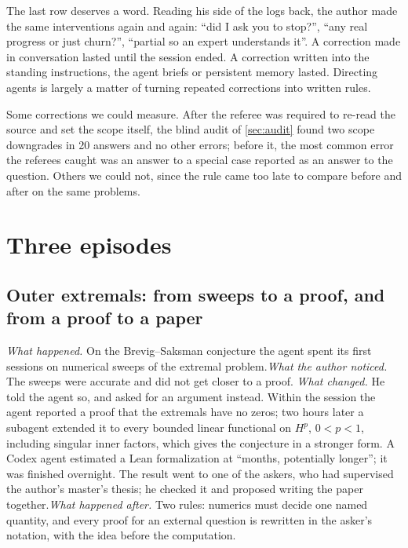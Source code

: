 \documentclass[11pt]{amsart}
\newcommand*{\sectionbreak}{\clearpage} %
\begin{document}
The last row deserves a word. Reading his side of the logs back, the author
made the same interventions again and again: ``did I ask you to stop?'', ``any %
real progress or just churn?'', ``partial %
so an expert understands it''. A correction made in conversation lasted until
the session ended. A correction written into the standing instructions, the
agent briefs or persistent memory lasted. Directing agents is largely a matter
of turning repeated corrections into written rules.

Some corrections we could measure. After the referee was required to re-read
the source and set the scope itself, the blind audit of \cref{sec:audit} found
two scope downgrades in 20 answers and no other errors; before it, the most
common error the referees caught was an answer to a special case reported as an
answer to the question. Others we could not, since the rule came too late to
compare before and after on the same problems.

\sectionbreak
\section{Three episodes}\label{sec:episodes}

\subsection*{Outer extremals: from sweeps to a proof, and from a proof to a paper}
\emph{What happened.} On the Brevig--Saksman conjecture the agent spent its
first sessions on numerical sweeps of the extremal problem.\@ \emph{What the
author noticed.} The sweeps were accurate and did not get closer to a proof.\@
\emph{What changed.} He told the agent so, and asked for an argument instead.
Within the session the agent reported a proof that the extremals have no zeros;
two hours later a subagent extended it to every bounded linear functional on
$H^p$, $0<p<1$, including singular inner factors, which gives the conjecture in
a stronger form. A Codex agent estimated a Lean formalization at ``months,
potentially longer''; it was finished overnight. The result went to one of the
askers, who had supervised the author's master's thesis; he checked it and
proposed writing the paper together.\@ \emph{What happened after.} Two rules:
numerics must decide one named quantity, and every proof for an external
question is rewritten in the asker's notation, with the idea before the
computation.
\end{document}
